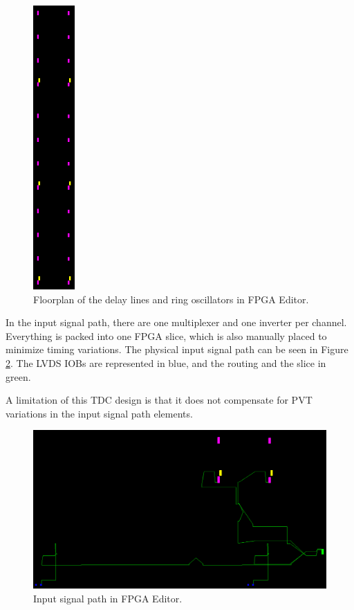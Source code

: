 \documentclass[a4paper,11pt]{article}
\begin{document}
\begin{figure}[H]
\centering
\includegraphics[width=1.6cm]{floorplan.png}
\caption{Floorplan of the delay lines and ring oscillators in FPGA Editor.}
\label{fig:floorplan}
\end{figure}

In the input signal path, there are one multiplexer and one inverter per channel. Everything is packed into one FPGA slice, which is also manually placed to minimize timing variations. The physical input signal path can be seen in Figure \ref{fig:inputpath}. The LVDS IOBs are represented in blue, and the routing and the slice in green.

A limitation of this TDC design is that it does not compensate for PVT variations in the input signal path elements.

\begin{figure}[H]
\includegraphics[width=\textwidth]{input_routes.png}
\caption{Input signal path in FPGA Editor.}
\label{fig:inputpath}
\end{figure}
\end{document}
